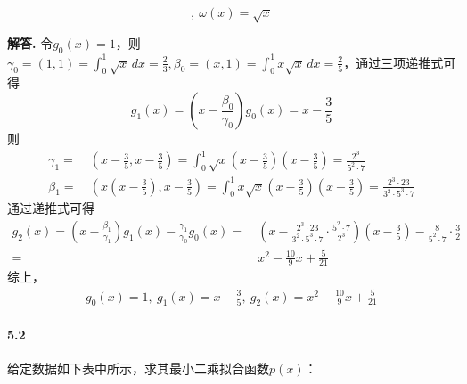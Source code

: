 \documentclass[12pt, a4paper, oneside]{ctexart}
\newenvironment{solution}{\par\noindent\textbf{解答. }}{\bigskip\par}
\begin{document}
\begin{equation*}
    [0,1],\ \omega(x)=\sqrt{x}
\end{equation*}
\begin{solution}
    令$g_0(x) = 1$，则$\gamma_0 = (1, 1) = \int_0^1\sqrt{x}\,dx = \frac{2}{3}, \beta_0 = (x, 1)=\int_0^1x\sqrt{x}\,dx=\frac{2}{5}$，通过三项递推式可得
    \begin{equation*}
        g_1(x) = (x-\frac{\beta_0}{\gamma_0})g_0(x) = x-\frac{3}{5}
    \end{equation*}
    则
    \begin{equation*}
        \begin{aligned}
            \gamma_1 = &\ (x-\frac{3}{5},x-\frac{3}{5}) = \int_0^1\sqrt{x}(x-\frac{3}{5})(x-\frac{3}{5}) = \frac{2^3}{5^2\cdot 7}\\
            \beta_1 = &\ (x(x-\frac{3}{5}), x-\frac{3}{5}) = \int_0^1x\sqrt{x}(x-\frac{3}{5})(x-\frac{3}{5}) = \frac{2^3\cdot 23}{3^2\cdot 5^3\cdot 7}
        \end{aligned}
    \end{equation*}
    通过递推式可得
    \begin{equation*}
        \begin{aligned}
            g_2(x) = (x-\frac{\beta_1}{\gamma_1})g_1(x) - \frac{\gamma_1}{\gamma_0}g_0(x) =&\ \left(x-\frac{2^3\cdot 23}{3^2\cdot 5^3\cdot 7}\cdot\frac{5^2\cdot 7}{2^3}\right)(x-\frac{3}{5})-\frac{8}{5^2\cdot 7}\cdot \frac{3}{2} \\
            =&\ x^2-\frac{10}{9}x+\frac{5}{21}
        \end{aligned}
    \end{equation*}
    综上，
    \begin{equation*}
        \begin{aligned}
            g_0(x) = 1,\ g_1(x) = x-\frac{3}{5},\  g_2(x) = x^2-\frac{10}{9}x+\frac{5}{21}
        \end{aligned}
    \end{equation*}
\end{solution}

\paragraph{5.2}给定数据如下表中所示，求其最小二乘拟合函数$p(x)$：
\end{document}
